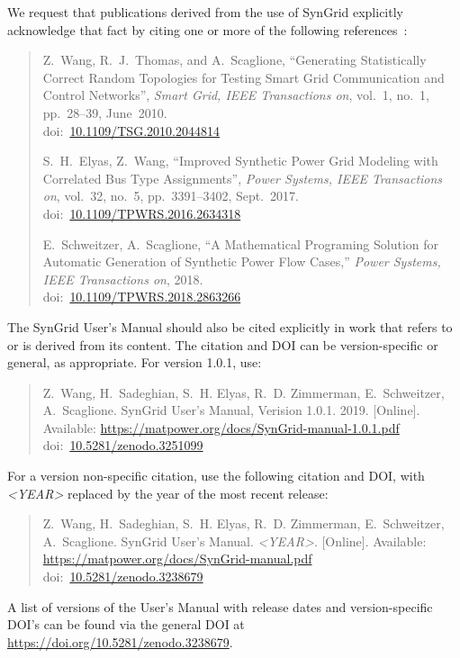 \documentclass[12pt]{article}
\newcommand{\syngrid}[0]{{SynGrid}}
\newcommand{\doi}[1]{doi:~\href{https://doi.org/#1}{#1}}
\numberwithin{equation}{section}
\numberwithin{table}{section}
\numberwithin{figure}{section}
\begin{document}
We request that publications derived from the use of \syngrid{} explicitly
acknowledge that fact by citing one or more of the following
references~\cite{syngrid_nestedSW, syngrid_bustype, schweitzer2018mathematical}:

\begin{quote}
\footnotesize
Z.~Wang, R.~J.~Thomas, and A.~Scaglione, ``Generating Statistically Correct Random Topologies for Testing Smart Grid Communication and Control Networks'', \emph{Smart Grid, IEEE Transactions on}, vol.~1, no.~1, pp.~28--39, June~2010. \\
\doi{10.1109/TSG.2010.2044814}

S.~H.~Elyas, Z.~Wang, ``Improved Synthetic Power Grid Modeling with Correlated Bus Type Assignments'', \emph{Power Systems, IEEE Transactions on}, vol.~32, no.~5, pp.~3391--3402, Sept.~2017. \\
\doi{10.1109/TPWRS.2016.2634318}

E.~Schweitzer, A.~Scaglione, ``A Mathematical Programing Solution for Automatic Generation of Synthetic Power Flow Cases,''  \emph{Power Systems, IEEE Transactions on}, 2018. \\
\doi{10.1109/TPWRS.2018.2863266}
\end{quote}

The \syngrid{} User's Manual should also be cited explicitly in work that
refers to or is derived from its content. The citation and DOI can be
version-specific or general, as appropriate. For version 1.0.1, use:

\begin{quote}
\footnotesize
Z.~Wang, H.~Sadeghian, S.~H. Elyas, R.~D. Zimmerman, E.~Schweitzer,
A.~Scaglione. \syngrid{} User's Manual, Verision 1.0.1. 2019. [Online]. Available: \url{https://matpower.org/docs/SynGrid-manual-1.0.1.pdf}\\
\doi{10.5281/zenodo.3251099}
\end{quote}
For a version non-specific citation, use the following citation and DOI,
with \emph{\textless{}YEAR\textgreater{}} replaced by the year of the most recent release:

\begin{quote}
\footnotesize
Z.~Wang, H.~Sadeghian, S.~H. Elyas, R.~D. Zimmerman, E.~Schweitzer,
A.~Scaglione. \syngrid{} User's Manual. \emph{\textless{}YEAR\textgreater{}}.
[Online]. Available: \url{https://matpower.org/docs/SynGrid-manual.pdf}\\
\doi{10.5281/zenodo.3238679}
\end{quote}
A list of versions of the User's Manual with release dates and
version-specific DOI's can be found via the general DOI at
\url{https://doi.org/10.5281/zenodo.3238679}.
\end{document}

